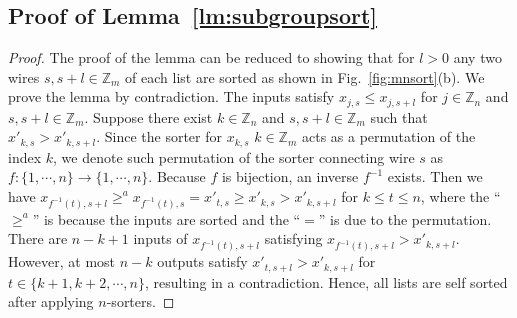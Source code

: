 \documentclass[10pt,journal,cspaper,compsoc]{IEEEtran}
\begin{document}
\subsection{Proof of Lemma~\ref{lm:subgroupsort}}
\label{pf:subgroupsort}
\begin{proof}
  The proof of the lemma can be reduced to showing that for $l > 0$ any two wires $s, s+l \in \mathbb{Z}_m$ of each list are sorted as shown in Fig.~\ref{fig:mnsort}(b). We prove the lemma by contradiction.
  The inputs satisfy $x_{j,s} \le x_{j,s+l}$ for $j \in \mathbb{Z}_n$ and $s, s+l \in \mathbb{Z}_m$.
  Suppose there exist $k \in \mathbb{Z}_n$ and $s, s+l \in \mathbb{Z}_m$ such that $x'_{k,s} > x'_{k,s+l}$. Since the sorter for $x_{k,s}$ $k \in \mathbb{Z}_m$ acts as a permutation of the index $k$, we denote such permutation of the sorter connecting wire $s$ as $f: \{1,\cdots,n\} \rightarrow \{1,\cdots,n\}$. Because $f$ is bijection, an inverse $f^{-1}$ exists. Then we have $x_{f^{-1}(t),s+l} \ge^a x_{f^{-1}(t),s} = x'_{t,s} \ge x'_{k,s} > x'_{k,s+l}$ for $k \le t \le n$, where the ``$\ge^a$'' is because the inputs are sorted and the ``$=$'' is due to the permutation.
  There are $n-k+1$ inputs of $x_{f^{-1}(t),s+l}$ satisfying $x_{f^{-1}(t),s+l} > x'_{k,s+l}$. However, at most $n-k$ outputs satisfy $x'_{t,s+l} > x'_{k,s+l}$ for $t \in \{k+1,k+2,\cdots,n\}$, resulting in a contradiction. Hence, all lists are self sorted after applying $n$-sorters.
\end{proof}
\end{document}
